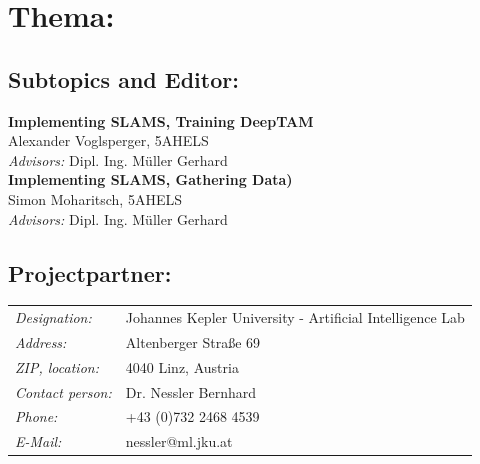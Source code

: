 

\chapter*{Thema: \newline \htlArbeitsthema }



\section*{Subtopics and Editor:}


\textbf{Implementing SLAMS, Training DeepTAM}\\ 
Alexander Voglsperger, 5AHELS\\
\emph{Advisors:} Dipl. Ing. Müller Gerhard\\[2ex] 
%
\textbf{Implementing SLAMS, Gathering Data)}\\ 
Simon Moharitsch, 5AHELS\\
\emph{Advisors:} Dipl. Ing. Müller Gerhard\\[2ex]



\section*{Projectpartner:}

\renewcommand{\arraystretch}{1.5}
\begin{tabularx}{1\textwidth}{@{} l X @{}}

\emph{Designation:} & Johannes Kepler University - Artificial Intelligence Lab\\
\emph{Address:} & Altenberger Straße 69\\
\emph{ZIP, location:} & 4040 Linz, Austria\\
\emph{Contact person:} & Dr. Nessler Bernhard\\
\emph{Phone:} & +43 (0)732 2468 4539\\
\emph{E-Mail:} & nessler@ml.jku.at\\

\end{tabularx}


